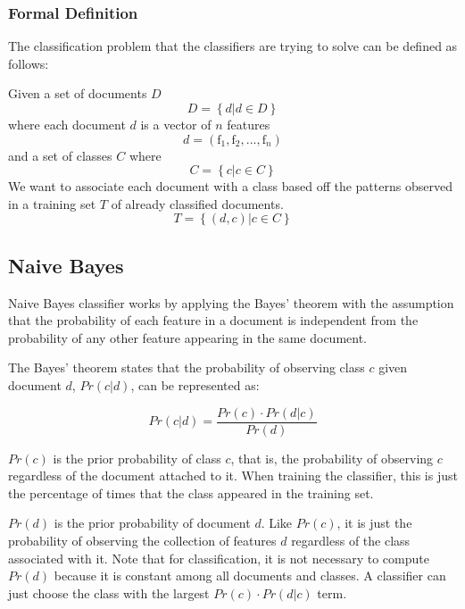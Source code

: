 \documentclass[12pt]{ucthesis}
\begin{document}
\subsubsection{Formal Definition}
\label{background-classifiers-def}
The classification problem that the classifiers are trying to solve can be defined as follows:

Given a set of documents $D$
\begin{equation*}
   D = \left \{ d | d \in D \right \}
\end{equation*}
where each document $d$ is a vector of $n$ features
\begin{equation*}
   d = (\textrm{f}_{1}, \textrm{f}_{2}, ..., \textrm{f}_{n})
\end{equation*}
and a set of classes $C$ where
\begin{equation*}
   C = \left \{ c | c \in C \right \}
\end{equation*}
We want to associate each document with a class based off the patterns observed in a training set $T$ of already classified documents.
\begin{equation*}
   T = \left \{ (d, c) | c \in C \right \}
\end{equation*}

\subsection{Naive Bayes}
\label{background-classifiers-naive-bayes}
Naive Bayes classifier works by applying the Bayes' theorem with the assumption that
the probability of each feature in a document is independent from the probability of
any other feature appearing in the same document.\cite{Kibriya}\cite{Frank}

The Bayes' theorem states that the probability of observing class $c$ given document $d$, $Pr(c|d)$, can be represented as:

\begin{equation}
   Pr(c|d) = \frac{Pr(c) \cdot Pr(d|c)}{Pr(d)}
\end{equation}

$Pr(c)$ is the \textsf{prior probability} of class $c$, that is, the probability of
observing $c$ regardless of the document attached to it. When training the classifier, this
is just the percentage of times that the class appeared in the training set.

$Pr(d)$ is the \textsf{prior probability} of document $d$. Like $Pr(c)$, it is just the
probability of observing the collection of features $d$ regardless of the class associated with it.
Note that for classification, it is not necessary to compute $Pr(d)$ because it is constant among all
documents and classes. A classifier can just choose the class with the largest $Pr(c) \cdot Pr(d|c)$ term.
\end{document}
